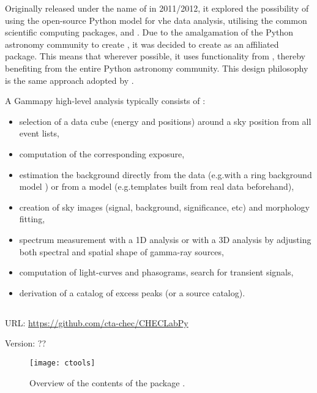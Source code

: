 \noindent Originally released under the name of  in 2011/2012, it explored the possibility of using the open-source Python model for \gls{vhe} data analysis, utilising the common scientific computing packages,  and  \cite{Deil2017}. Due to the amalgamation of the Python astronomy community to create , it was decided to create  as an  affiliated package. This means that wherever possible, it uses functionality from , thereby benefiting from the entire Python astronomy community. This design philosophy is the same approach adopted by . 

A Gammapy high-level analysis typically consists of \cite[][p. 4]{Deil2017}:
\begin{itemize}
\item selection of a data cube (energy and positions) around a sky position from all event lists,
\item computation of the corresponding exposure,
\item estimation the background directly from the data (e.g.\@ with a ring background model \cite{Berge2007}) or from a model (e.g.\@ templates built from real data beforehand),
\item creation of sky images (signal, background, significance, etc) and morphology fitting,
\item spectrum measurement with a 1D analysis or with a 3D analysis by adjusting both spectral and spatial shape of gamma-ray sources,
\item computation of light-curves and phasograms, search for transient signals,
\item derivation of a catalog of excess peaks (or a source catalog).
\end{itemize}

\subsection{}
\vspace{-0.7em}
\noindent \hspace{\parindent} {\tiny URL: \url{https://github.com/cta-chec/CHECLabPy} \par}
\noindent \hspace{\parindent} {\tiny Version: ?? \par}

\begin{figure}[t]
  \centering
  \texttt{[image: ctools]}
  \caption[Overview of .]{Overview of the contents of the  package \cite{Knodlseder2016}.}
  \label{fig:ctools}
\end{figure}

